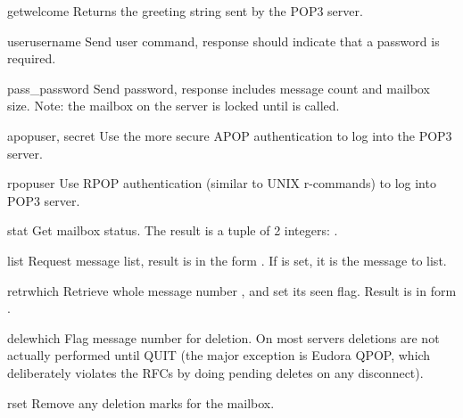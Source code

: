 \begin{methoddesc}{getwelcome}{}
Returns the greeting string sent by the POP3 server.
\end{methoddesc}


\begin{methoddesc}{user}{username}
Send user command, response should indicate that a password is required.
\end{methoddesc}

\begin{methoddesc}{pass_}{password}
Send password, response includes message count and mailbox size.
Note: the mailbox on the server is locked until  is
called.
\end{methoddesc}

\begin{methoddesc}{apop}{user, secret}
Use the more secure APOP authentication to log into the POP3 server.
\end{methoddesc}

\begin{methoddesc}{rpop}{user}
Use RPOP authentication (similar to UNIX r-commands) to log into POP3 server.
\end{methoddesc}

\begin{methoddesc}{stat}{}
Get mailbox status.  The result is a tuple of 2 integers:
.
\end{methoddesc}

\begin{methoddesc}{list}{}
Request message list, result is in the form
.  If  is
set, it is the message to list.
\end{methoddesc}

\begin{methoddesc}{retr}{which}
Retrieve whole message number , and set its seen flag.
Result is in form  .
\end{methoddesc}

\begin{methoddesc}{dele}{which}
Flag message number  for deletion.  On most servers
deletions are not actually performed until QUIT (the major exception is
Eudora QPOP, which deliberately violates the RFCs by doing pending 
deletes on any disconnect).
\end{methoddesc}

\begin{methoddesc}{rset}{}
Remove any deletion marks for the mailbox.
\end{methoddesc}

